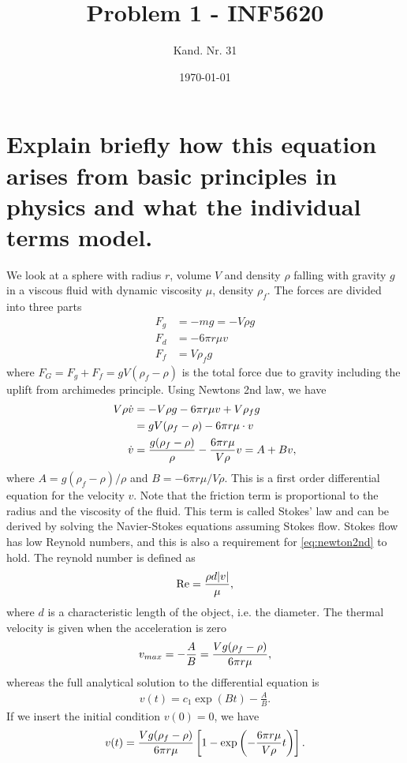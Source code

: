 \documentclass[a4paper,10pt]{article}
\title{Problem 1 - INF5620}
\date{\today}
\author{Kand. Nr. 31}
\renewcommand{\(}{\left(}
\renewcommand{\)}{\right)}
\begin{document}
\section{Explain briefly how this equation arises from basic principles in physics and what the individual terms model.}
We look at a sphere with radius $r$, volume $V$ and density $\rho$ falling with gravity $g$ in a viscous fluid with dynamic viscosity $\mu$, density $\rho_f$. The forces are divided into three parts
\begin{align*}
  F_g &= -mg = -V\rho g\\
  F_d &= -6\pi r\mu v\\
  F_f &= V\rho_f g
\end{align*}
where $F_G = F_g + F_f = gV(\rho_f - \rho)$ is the total force due to gravity including the uplift from archimedes principle. Using Newtons 2nd law, we have
\begin{align}
  \nonumber
  V\rho \dot v &= -V\rho g -6\pi r\mu v + V\rho_f g\\
  \nonumber
  &= gV(\rho_f - \rho) -6\pi r\mu \cdot v\\
  \label{eq:newton2nd}
  \dot v &= {g(\rho_f - \rho) \over \rho} -{6\pi r\mu \over V\rho }v = A + Bv,
\end{align}
where $A=g(\rho_f - \rho)/\rho$ and $B=-6\pi r\mu /V\rho$. This is a first order differential equation for the velocity $v$. Note that the friction term is proportional to the radius and the viscosity of the fluid. This term is called Stokes' law and can be derived by solving the Navier-Stokes equations assuming Stokes flow. Stokes flow has low Reynold numbers, and this is also a requirement for \eqref{eq:newton2nd} to hold. The reynold number is defined as
\begin{align}
  \label{eq:reynold}
  \text{Re} = {\rho d|v| \over \mu},
 \end{align}
where $d$ is a characteristic length of the object, i.e. the diameter. The thermal velocity is given when the acceleration is zero
\begin{align*}
  v_{max} = -{A \over B} = {Vg(\rho_f - \rho) \over {6\pi r\mu}},
\end{align*}
whereas the full analytical solution to the differential equation is
\begin{align*}
  v(t) = c_1\exp(Bt) - \frac{A}{B}.
\end{align*}
If we insert the initial condition $v(0)=0$, we have
\begin{align*}
  v(t) = {Vg(\rho_f - \rho) \over {6\pi r\mu}}\left[1 - \exp\left(-\frac{6\pi r\mu}{V\rho}t\right)\right].
\end{align*}
\end{document}
